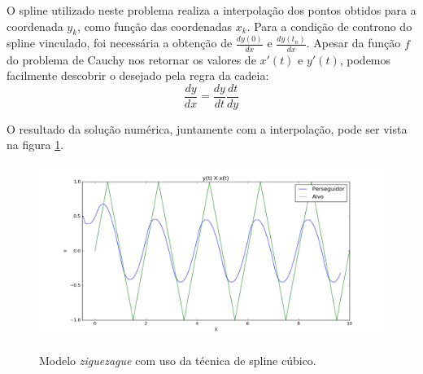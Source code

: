 \documentclass[a4paper,10pt]{article}
\begin{document}
  O spline utilizado neste problema realiza a interpolação dos pontos obtidos para a coordenada $y_k$, como função das coordenadas $x_k$. Para a condição de controno do spline vinculado, foi necessária a obtenção de $\frac{dy(0)}{dx}$ e $\frac{dy(t_n)}{dx}$. Apesar da função $f$ do problema de Cauchy nos retornar os valores de $x'(t)$ e $y'(t)$, podemos facilmente descobrir o desejado pela regra da cadeia:
  \begin{equation}
   \frac{dy}{dx} = \frac{dy}{dt} \frac{dt}{dy}
  \end{equation}
  
  O resultado da solução numérica, juntamente com a interpolação, pode ser vista na figura \ref{fig:curva-zz}.
  
  \begin{figure}[H]
   \includegraphics[width=\textwidth]{zz-XY-spline.png}
   \label{fig:curva-zz}
   \caption{Modelo \emph{ziguezague} com uso da técnica de spline cúbico.}
  \end{figure}  
  
\end{document}
